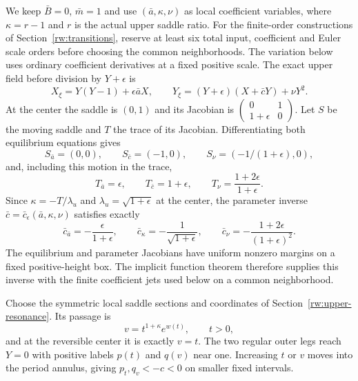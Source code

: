 We keep $\bar B=0$, $\bar m=1$ and use
$(\bar a,\kappa,\nu)$ as local coefficient variables, where
$\kappa=r-1$ and $r$ is the actual upper saddle ratio.
For the finite-order constructions of Section~\ref{rw:transitions},
reserve at least six total input, coefficient and Euler scale orders
before choosing the common neighborhoods. The variation below uses
ordinary coefficient derivatives at a fixed positive scale.
The exact upper field before division by $Y+\epsilon$ is
\[
 X_\xi=Y(Y-1)+\epsilon\bar aX,\qquad
 Y_\xi=(Y+\epsilon)(X+\bar cY)+\nu Y^2.
\]
At the center the saddle is $(0,1)$ and its Jacobian is
$\left(\begin{smallmatrix}0&1\\1+\epsilon&0\end{smallmatrix}\right)$.
Let $S$ be the moving saddle and $T$ the trace of its Jacobian.
Differentiating both equilibrium equations gives
\[
 S_{\bar a}=(0,0),\qquad S_{\bar c}=(-1,0),\qquad
 S_\nu=(-1/(1+\epsilon),0),
\]
and, including this motion in the trace,
\[
 T_{\bar a}=\epsilon,\qquad T_{\bar c}=1+\epsilon,\qquad
 T_\nu=\frac{1+2\epsilon}{1+\epsilon}.
\]
Since $\kappa=-T/\lambda_u$ and $\lambda_u=\sqrt{1+\epsilon}$
at the center, the parameter inverse
$\bar c=\bar c_\epsilon(\bar a,\kappa,\nu)$ satisfies exactly
\begin{equation}\label{rw:lower:actual-ratio}
 \bar c_{\bar a}=-\frac{\epsilon}{1+\epsilon},\qquad
 \bar c_\kappa=-\frac1{\sqrt{1+\epsilon}},\qquad
 \bar c_\nu=-\frac{1+2\epsilon}{(1+\epsilon)^2}.
\end{equation}
The equilibrium and parameter Jacobians have uniform nonzero
margins on a fixed positive-height box. The implicit function
theorem therefore supplies this inverse with the finite coefficient
jets used below on a common neighborhood.

Choose the symmetric local saddle sections and coordinates of
Section~\ref{rw:upper-resonance}. Its passage is
\[
 v=t^{1+\kappa}e^{w(t)},\qquad t>0,
\]
and at the reversible center it is exactly $v=t$.
The two regular outer legs reach $Y=0$ with positive labels $p(t)$
and $q(v)$ near one. Increasing $t$ or $v$ moves into the period
annulus, giving $p_t,q_v<-c<0$ on smaller fixed intervals.

